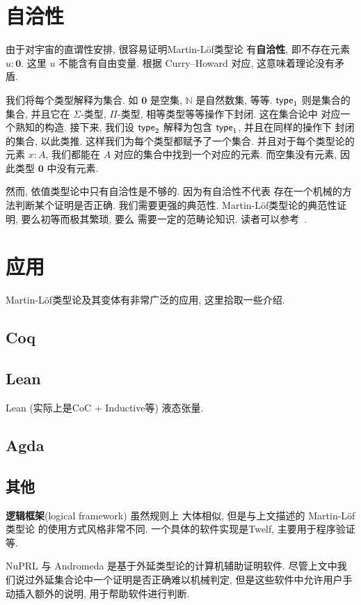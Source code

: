 \section{自洽性}

由于对宇宙的直谓性安排, 很容易证明Martin-L\"of类型论
有\textbf{自洽性}, 即不存在元素 \(u : \mathbf 0\).
这里 \(u\) 不能含有自由变量. 根据 Curry--Howard 对应,
这意味着理论没有矛盾.

我们将每个类型解释为集合. 如 \(\mathbf 0\) 是空集,
\(\mathbb{N}\) 是自然数集, 等等. \(\textsf{type}_1\)
则是集合的集合, 并且它在 \(\Sigma\)-类型,
\(\Pi\)-类型, 相等类型等等操作下封闭. 这在集合论中
对应一个熟知的构造. 接下来, 我们设 \(\textsf{type}_2\)
解释为包含 \(\textsf{type}_1\), 并且在同样的操作下
封闭的集合, 以此类推. 这样我们为每个类型都赋予了一个集合.
并且对于每个类型论的元素 \(x : A\), 我们都能在 \(A\)
对应的集合中找到一个对应的元素. 而空集没有元素, 因此类型
\(\mathbf 0\) 中没有元素.

然而, 依值类型论中只有自洽性是不够的. 因为有自洽性不代表
存在一个机械的方法判断某个证明是否正确. 我们需要更强的典范性.
Martin-L\"of类型论的典范性证明, 要么初等而极其繁琐, 要么
需要一定的范畴论知识. 读者可以参考~\cite[\S5.6]{sterling:2021:thesis}.

\section{应用}

Martin-L\"of类型论及其变体有非常广泛的应用, 这里拾取一些介绍.

\subsection{Coq}

\subsection{Lean}

Lean (实际上是CoC + Inductive等)
液态张量.\cite{scholze:2020:liquid}

\subsection{Agda}

\subsection{其他}

\textbf{逻辑框架}(logical framework) 虽然规则上
大体相似, 但是与上文描述的 Martin-L\"of 类型论
的使用方式风格非常不同. 一个具体的软件实现是Twelf,
主要用于程序验证等.

NuPRL 与 Andromeda 是基于外延类型论的计算机辅助证明软件.
尽管上文中我们说过外延集合论中一个证明是否正确难以机械判定,
但是这些软件中允许用户手动插入额外的说明, 用于帮助软件进行判断.

